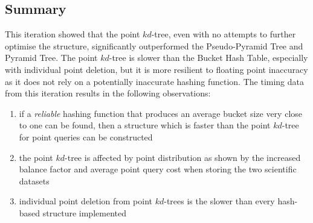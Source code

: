 \subsection{Summary}

This iteration showed that the point $kd$-tree, even with no attempts to further optimise the structure, significantly outperformed the Pseudo-Pyramid Tree and Pyramid Tree. The point $kd$-tree is slower than the Bucket Hash Table, especially with individual point deletion, but it is more resilient to floating point inaccuracy as it does not rely on a potentially inaccurate hashing function. The timing data from this iteration results in the following observations:
\begin{enumerate}[noitemsep]
	\item if a \textit{reliable} hashing function that produces an average bucket size very close to one can be found, then a structure which is faster than the point $kd$-tree for point queries can be constructed
	\item the point $kd$-tree is affected by point distribution as shown by the increased balance factor and average point query cost when storing the two scientific datasets
	\item individual point deletion from point $kd$-trees is the slower than every hash-based structure implemented
\end{enumerate}

